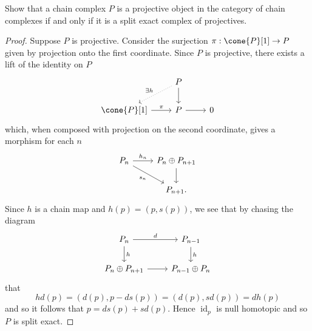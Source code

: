 \documentclass[10pt]{amsart}
\begin{document}
\begin{ex}
  Show that a chain complex $P$ is a projective object in the category of chain complexes if and only if it is a split exact complex of projectives.

  \begin{proof}
    Suppose $P$ is projective.
    Consider the surjection $\pi : \cone{P}[1] \rightarrow P$ given by projection onto the first coordinate.
    Since $P$ is projective, there exists a lift of the identity on $P$
    $$\begin{tikzcd}
      & P \arrow{d}\arrow[dotted,swap]{ld}{\exists h} &\\
      \cone{P}[1] \arrow{r}{\pi} & P \arrow{r} & 0
    \end{tikzcd}$$
    which, when composed with projection on the second coordinate, gives a morphism for each $n$
    $$\begin{tikzcd}
      P_n \arrow[swap]{rd}{s_n}\arrow{r}{h_n} & P_n \oplus P_{n+1}\arrow{d}\\
      & P_{n+1}.
    \end{tikzcd}$$
    Since $h$ is a chain map and $h(p) = (p, s(p))$, we see that by chasing the diagram
    $$\begin{tikzcd}
      P_n \arrow{d}{h} \arrow{r}{d} & P_{n-1}\arrow{d}{h}\\
      P_n \oplus P_{n+1} \arrow{r} & P_{n-1} \oplus P_{n}
    \end{tikzcd}$$
    that
    $$hd(p) = (d(p), p - ds(p)) = (d(p), sd(p)) = dh(p)$$
    and so it follows that $p = ds(p) + sd(p)$.
    Hence $\operatorname{id}_p$ is null homotopic and so $P$ is split exact.


\end{proof}
\end{ex}
\end{document}
